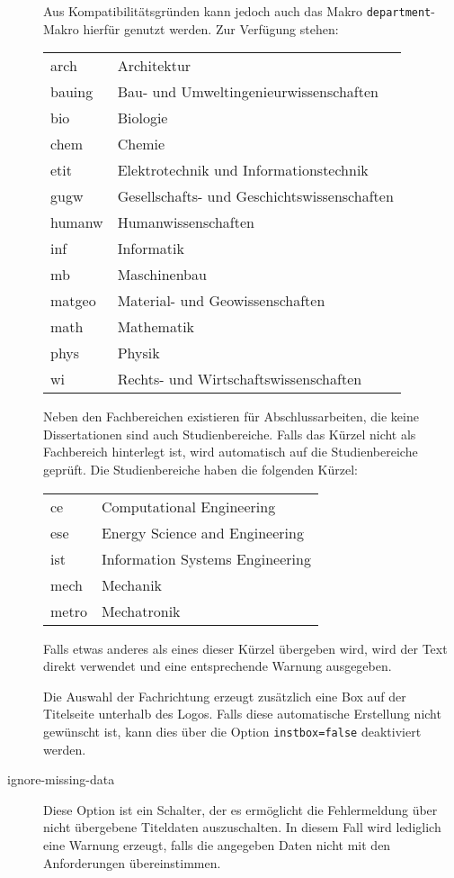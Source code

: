 \documentclass[
	german,%
	ruledheaders=section,%
	class=report,%
	thesis={type=bachelor},%
	fontsize=11pt,%
	parskip=half-,%
	custommargins=true,%
	marginpar=false,%
	accentcolor=9c,%
]{tudapub}
\let\code\texttt
\begin{document}
\begin{description}
	      Aus Kompatibilitätsgründen kann jedoch auch das Makro \code{department}-Makro hierfür genutzt werden.
	      Zur Verfügung stehen:\par
	      \begin{tabular}{@{}l@{${}\to{}$}l@{}}
		      arch  & Architektur\\
		      bauing& Bau- und Umweltingenieurwissenschaften\\
		      bio   &Biologie\\
		      chem  &Chemie\\
		      etit  &Elektrotechnik und Informationstechnik\\
		      gugw  &Gesellschafts- und Geschichtswissenschaften\\
		      humanw&Humanwissenschaften\\
		      inf   &Informatik\\
		      mb    &Maschinenbau\\
		      matgeo&Material- und Geowissenschaften\\
		      math  &Mathematik\\
		      phys  &Physik\\
		      wi    &Rechts- und Wirtschaftswissenschaften
	      \end{tabular}

	      Neben den Fachbereichen existieren für Abschlussarbeiten, die keine Dissertationen sind auch Studienbereiche.
	      Falls das Kürzel nicht als Fachbereich hinterlegt ist, wird automatisch auf die Studienbereiche geprüft.
	      Die Studienbereiche haben die folgenden Kürzel:

	      \begin{tabular}{@{}l@{${}\to{}$}l@{}}
		      ce&Computational Engineering\\
		      ese&Energy Science and Engineering\\
		      ist&Information Systems Engineering\\
		      mech&Mechanik\\
		      metro&Mechatronik
	      \end{tabular}

	      Falls etwas anderes als eines dieser Kürzel übergeben wird, wird der Text direkt verwendet und eine entsprechende Warnung ausgegeben.

	      Die Auswahl der Fachrichtung erzeugt zusätzlich eine Box auf der Titelseite unterhalb des Logos.
	      Falls diese automatische Erstellung nicht gewünscht ist, kann dies über die Option \code{instbox=false} deaktiviert werden.
	\item[ignore-missing-data] Diese Option ist ein Schalter, der es ermöglicht die Fehlermeldung über nicht übergebene Titeldaten auszuschalten.
	      In diesem Fall wird lediglich eine Warnung erzeugt, falls die angegeben Daten nicht mit den Anforderungen übereinstimmen.
\end{description}
\end{document}
